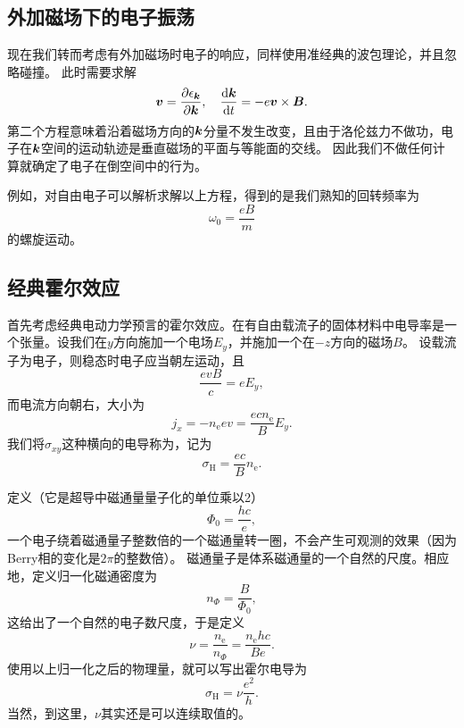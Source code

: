 \subsection{外加磁场下的电子振荡}

现在我们转而考虑有外加磁场时电子的响应，同样使用准经典的波包理论，并且忽略碰撞。
此时需要求解
\begin{equation}
    \vb*{v} = \pdv{\epsilon_{\vb*{k}}}{\vb*{k}}, \quad \dv{\vb*{k}}{t} = -e \vb*{v} \times \vb*{B}.
    \label{eq:calssical-magnetic-field}
\end{equation}
第二个方程意味着沿着磁场方向的$\vb*{k}$分量不发生改变，且由于洛伦兹力不做功，电子在$\vb*{k}$空间的运动轨迹是垂直磁场的平面与等能面的交线。
因此我们不做任何计算就确定了电子在倒空间中的行为。

例如，对自由电子可以解析求解以上方程，得到的是我们熟知的回转频率为
\begin{equation}
    \omega_0 = \frac{e B}{m}
\end{equation}
的螺旋运动。

\subsection{经典霍尔效应}\label{sec:classical-hall-effect}

首先考虑经典电动力学预言的霍尔效应。在有自由载流子的固体材料中电导率是一个张量。设我们在$y$方向施加一个电场$E_y$，并施加一个在$-z$方向的磁场$B$。
设载流子为电子，则稳态时电子应当朝左运动，且
\[
    \frac{e v B}{c} = e E_y,
\]
而电流方向朝右，大小为
\[
    j_x = - n_\text{e} e v = \frac{e c n_\text{e}}{B} E_y.
\]
我们将$\sigma_{xy}$这种横向的电导称为，记为
\begin{equation}
    \sigma_\text{H} = \frac{ec}{B} n_\text{e}.
\end{equation}

定义（它是超导中磁通量量子化的单位乘以2）
\begin{equation}
    \Phi_0 = \frac{h c}{e},
\end{equation}
一个电子绕着磁通量子整数倍的一个磁通量转一圈，不会产生可观测的效果（因为Berry相的变化是$2\pi$的整数倍）。
磁通量子是体系磁通量的一个自然的尺度。相应地，定义归一化磁通密度为
\begin{equation}
    n_{\Phi} = \frac{B}{\Phi_0},
\end{equation}
这给出了一个自然的电子数尺度，于是定义
\begin{equation}
    \nu = \frac{n_\text{e}}{n_\Phi} = \frac{n_\text{e} h c}{B e}.
\end{equation}
使用以上归一化之后的物理量，就可以写出霍尔电导为
\begin{equation}
    \sigma_\text{H} = \nu \frac{e^2}{h}.
\end{equation}
当然，到这里，$\nu$其实还是可以连续取值的。

